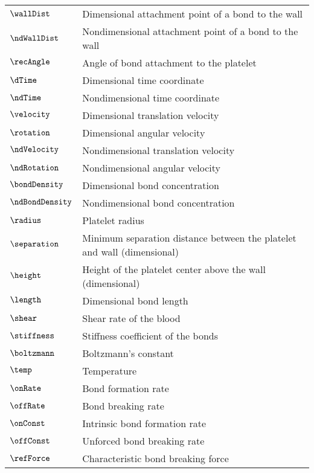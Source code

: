 
\begin{tabular}{ll}
  \toprule
  $\wallDist$ & Dimensional attachment point of a bond to the wall\\
  $\ndWallDist$ & Nondimensional attachment point of a bond to the wall\\
  $\recAngle$ & Angle of bond attachment to the platelet\\
  $\dTime$ & Dimensional time coordinate \\
  $\ndTime$ & Nondimensional time coordinate\\
  $\velocity$ & Dimensional translation velocity \\
  $\rotation$ & Dimensional angular velocity \\
  $\ndVelocity$ & Nondimensional translation velocity \\
  $\ndRotation$ & Nondimensional angular velocity \\
  $\bondDensity$ & Dimensional bond concentration \\
  $\ndBondDensity$ & Nondimensional bond concentration \\
  $\radius$ & Platelet radius \\
  $\separation$ & Minimum separation distance between the platelet and
                  wall (dimensional)\\
  $\height$ & Height of the platelet center above the wall
              (dimensional) \\
  $\length$ & Dimensional bond length \\
  $\shear$ & Shear rate of the blood \\
  $\stiffness$ & Stiffness coefficient of the bonds \\
  $\boltzmann$ & Boltzmann's constant \\
  $\temp$ & Temperature \\
  $\onRate$ & Bond formation rate \\
  $\offRate$ & Bond breaking rate \\
  $\onConst$ & Intrinsic bond formation rate \\
  $\offConst$ & Unforced bond breaking rate \\
  $\refForce$ & Characteristic bond breaking force \\

\end{tabular}

